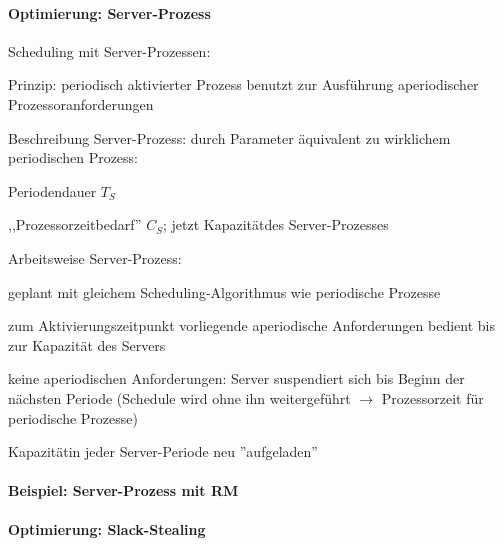 \documentclass[a4paper]{article}
\begin{document}
\begin{multicols}{3}
    \paragraph{Optimierung:
        Server-Prozess}

    \begin{itemize*}
        \item
        Scheduling mit Server-Prozessen:
        \begin{itemize*}
            \item Prinzip: periodisch aktivierter Prozess benutzt zur Ausführung aperiodischer Prozessoranforderungen
            \item Beschreibung Server-Prozess: durch Parameter äquivalent zu wirklichem periodischen Prozess: \begin{itemize*} \item Periodendauer $T_S$ \item ,,Prozessorzeitbedarf'' $C_S$; jetzt Kapazitätdes Server-Prozesses \end{itemize*}
            \item Arbeitsweise Server-Prozess: \begin{itemize*} \item geplant mit gleichem Scheduling-Algorithmus wie periodische Prozesse \item zum Aktivierungszeitpunkt vorliegende aperiodische Anforderungen bedient bis zur Kapazität des Servers \item keine aperiodischen Anforderungen: Server suspendiert sich bis Beginn der nächsten Periode (Schedule wird ohne ihn weitergeführt $\rightarrow$ Prozessorzeit für periodische Prozesse) \item Kapazitätin jeder Server-Periode neu ''aufgeladen'' \end{itemize*}
        \end{itemize*}
    \end{itemize*}


    \paragraph{Beispiel: Server-Prozess mit
        RM}



    \paragraph{Optimierung:
        Slack-Stealing}


\end{multicols}
\end{document}
